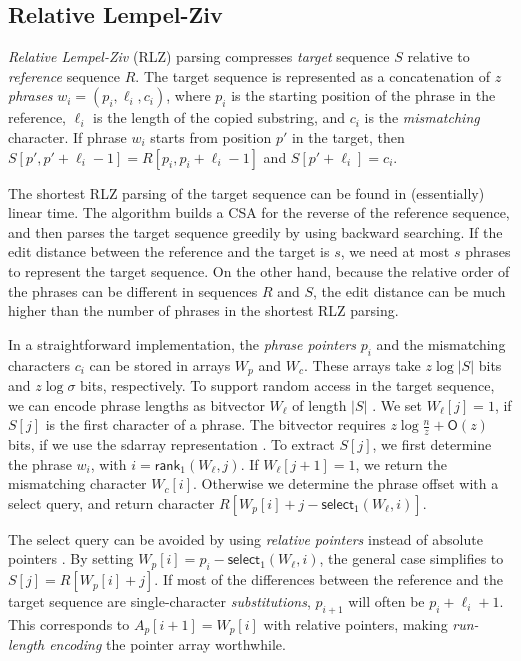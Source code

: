 \documentclass[a4paper,11pt]{llncs}
\newcommand{\abs}[1]{\ensuremath{\lvert #1 \rvert}}
\newcommand{\CSA}{\textsf{CSA}}
\newcommand{\RLZ}{\textsf{RLZ}}
\newcommand{\sdarray}{\textsf{sdarray}}
\newcommand{\select}{\textsf{select}}
\newcommand{\mrank}{\ensuremath{\mathsf{rank}}}
\newcommand{\mselect}{\ensuremath{\mathsf{select}}}
\newcommand{\Oh}{\ensuremath{\mathsf{O}}}
\begin{document}
\subsection{Relative Lempel-Ziv}\label{sect:rlz}

\emph{Relative Lempel-Ziv} (\RLZ) parsing \cite{Kuruppu2010} compresses \emph{target} sequence $S$ relative to \emph{reference} sequence $R$. The target sequence is represented as a concatenation of $z$ \emph{phrases} $w_{i} = (p_{i}, \ell_{i}, c_{i})$, where $p_{i}$ is the starting position of the phrase in the reference, $\ell_{i}$ is the length of the copied substring, and $c_{i}$ is the \emph{mismatching} character. If phrase $w_{i}$ starts from position $p'$ in the target, then $S[p',p'+\ell_{i}-1] = R[p_{i},p_{i}+\ell_{i}-1]$ and $S[p'+\ell_{i}] = c_{i}$.

The shortest \RLZ{} parsing of the target sequence can be found in (essentially) linear time. The algorithm builds a \CSA{} for the reverse of the reference sequence, and then parses the target sequence greedily by using backward searching. If the edit distance between the reference and the target is $s$, we need at most $s$ phrases to represent the target sequence. On the other hand, because the relative order of the phrases can be different in sequences $R$ and $S$, the edit distance can be much higher than the number of phrases in the shortest \RLZ{} parsing.

In a straightforward implementation, the \emph{phrase pointers} $p_{i}$ and the mismatching characters $c_{i}$ can be stored in arrays $W_{p}$ and $W_{c}$. These arrays take $z \log \abs{S}$ bits and $z \log \sigma$ bits, respectively. To support random access in the target sequence, we can encode phrase lengths as bitvector $W_{\ell}$ of length $\abs{S}$ \cite{Kuruppu2010}. We set $W_{\ell}[j] = 1$, if $S[j]$ is the first character of a phrase. The bitvector requires $z \log \frac{n}{z} + \Oh(z)$ bits, if we use the \sdarray{} representation \cite{Okanohara2007}. To extract $S[j]$, we first determine the phrase $w_{i}$, with $i = \mrank_{1}(W_{\ell}, j)$. If $W_{\ell}[j+1] = 1$, we return the mismatching character $W_{c}[i]$. Otherwise we determine the phrase offset with a \select{} query, and return character $R[W_{p}[i] + j - \mselect_{1}(W_{\ell}, i)]$.

The \select{} query can be avoided by using \emph{relative pointers} instead of absolute pointers \cite{Ferrada2014}. By setting $W_{p}[i] = p_{i} - \mselect_{1}(W_{\ell}, i)$, the general case simplifies to $S[j] = R[W_{p}[i] + j]$. If most of the differences between the reference and the target sequence are single-character \emph{substitutions}, $p_{i+1}$ will often be $p_{i} + \ell_{i} + 1$. This corresponds to $A_{p}[i+1] = W_{p}[i]$ with relative pointers, making \emph{run-length encoding} the pointer array worthwhile.
\end{document}
